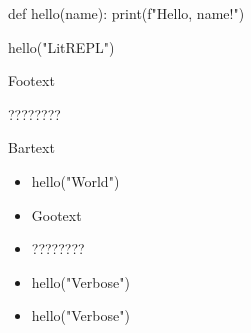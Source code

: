 \documentclass{article}
\newenvironment{lcode}{\begin{texttt}}{\end{texttt}}
\newenvironment{lresult}{\begin{texttt}}{\end{texttt}}
\begin{document}
\begin{lcode}
def hello(name):
  print(f"Hello, {name}!")

hello("LitREPL")
\end{lcode}

Footext

\begin{lresult}
????????
\end{lresult}

Bartext

\begin{itemize}
  \item
  \begin{lcode}
  hello("World")
  \end{lcode}

  \item Gootext

  \item
  \begin{lresult}
  ????????
  \end{lresult}

  \item
  \begin{lcode}
  hello("Verbose")
  \end{lcode}

  \item
  hello("Verbose")
\end{itemize}
\end{document}
